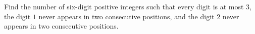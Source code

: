 Find the number of six-digit positive integers such that every digit is at most $3$, the digit $1$ never appears in two consecutive positions, and the digit $2$ never appears in two consecutive positions.
